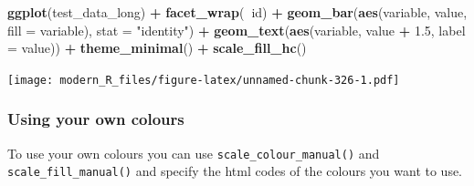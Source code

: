 \documentclass[]{gitbook}
\newenvironment{Shaded}{\begin{snugshade}}{\end{snugshade}}
\newcommand{\DataTypeTok}[1]{\textcolor[rgb]{0.13,0.29,0.53}{#1}}
\newcommand{\FloatTok}[1]{\textcolor[rgb]{0.00,0.00,0.81}{#1}}
\newcommand{\KeywordTok}[1]{\textcolor[rgb]{0.13,0.29,0.53}{\textbf{#1}}}
\newcommand{\NormalTok}[1]{#1}
\newcommand{\OperatorTok}[1]{\textcolor[rgb]{0.81,0.36,0.00}{\textbf{#1}}}
\newcommand{\StringTok}[1]{\textcolor[rgb]{0.31,0.60,0.02}{#1}}
\theoremstyle{definition}
\theoremstyle{definition}
\theoremstyle{definition}
\theoremstyle{remark}
\begin{document}
\begin{Shaded}
\begin{Highlighting}[]
\KeywordTok{ggplot}\NormalTok{(test_data_long) }\OperatorTok{+}
\StringTok{  }\KeywordTok{facet_wrap}\NormalTok{(}\OperatorTok{~}\NormalTok{id) }\OperatorTok{+}
\StringTok{  }\KeywordTok{geom_bar}\NormalTok{(}\KeywordTok{aes}\NormalTok{(variable, value, }\DataTypeTok{fill =}\NormalTok{ variable), }\DataTypeTok{stat =} \StringTok{"identity"}\NormalTok{) }\OperatorTok{+}
\StringTok{  }\KeywordTok{geom_text}\NormalTok{(}\KeywordTok{aes}\NormalTok{(variable, value }\OperatorTok{+}\StringTok{ }\FloatTok{1.5}\NormalTok{, }\DataTypeTok{label =}\NormalTok{ value)) }\OperatorTok{+}
\StringTok{  }\KeywordTok{theme_minimal}\NormalTok{() }\OperatorTok{+}
\StringTok{  }\KeywordTok{scale_fill_hc}\NormalTok{()}
\end{Highlighting}
\end{Shaded}

\texttt{[image: modern\_R\_files/figure-latex/unnamed-chunk-326-1.pdf]}

\hypertarget{using-your-own-colours}{%
\subsubsection{Using your own colours}\label{using-your-own-colours}}

To use your own colours you can use \texttt{scale\_colour\_manual()} and
\texttt{scale\_fill\_manual()} and specify the html codes of the colours
you want to use.

\begin{Shaded}
\end{Shaded}
\end{document}
